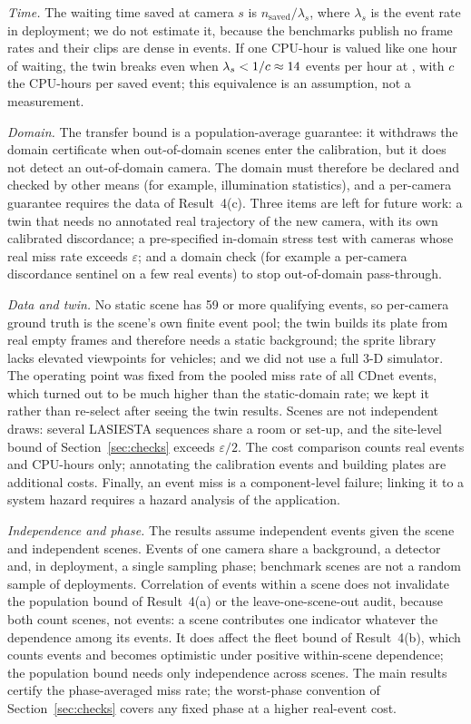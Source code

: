 \emph{Time.} The waiting time saved at camera $s$ is $n_{\mathrm{saved}}/\lambda_s$, where $\lambda_s$ is the event rate
in deployment; we do not estimate it, because the benchmarks publish no frame rates and their clips are dense in events.
If one CPU-hour is valued like one hour of waiting, the twin breaks even when $\lambda_s<1/c\approx14$ events per
hour at \OPs{}, with $c$ the CPU-hours per saved event; this equivalence is an assumption, not a measurement.

\emph{Domain.} The transfer bound is a population-average guarantee: it withdraws the domain certificate when
out-of-domain scenes enter the calibration, but it does not detect an out-of-domain camera. The domain must therefore be
declared and checked by other means (for example, illumination statistics), and a per-camera guarantee requires the
data of Result~4(c). Three items are left for future work: a twin that needs no annotated real trajectory of the new camera, with its own
calibrated discordance; a pre-specified in-domain stress test with cameras whose real miss rate exceeds $\varepsilon$;
and a domain check (for example a per-camera discordance sentinel on a few real events) to stop out-of-domain
pass-through.

\emph{Data and twin.} No static scene has 59 or more qualifying events, so per-camera ground truth is the scene's own
finite event pool; the twin builds its plate from real empty frames and therefore needs a static background; the sprite
library lacks elevated viewpoints for vehicles; and we did not use a full 3-D simulator. The operating point was fixed
from the pooled miss rate of all CDnet events, which turned out to be much higher than the static-domain rate; we kept it
rather than re-select after seeing the twin results. Scenes are not independent draws: several LASIESTA sequences share a room or set-up, and the site-level bound of
Section~\ref{sec:checks} exceeds $\varepsilon/2$. The
cost comparison counts real events and CPU-hours only; annotating the calibration events and building plates are
additional costs. Finally, an event miss is a component-level failure; linking it to a system hazard requires a
hazard analysis of the application.

\emph{Independence and phase.} The results assume independent events given the scene and independent scenes. Events
of one camera share a background, a detector and, in deployment, a single sampling phase; benchmark scenes are not a
random sample of deployments. Correlation of events within a scene does not invalidate the population bound of
Result~4(a) or the leave-one-scene-out audit, because both count scenes, not events: a scene contributes one
indicator whatever the dependence among its events. It does affect the fleet bound of Result~4(b), which counts
events and becomes optimistic under positive within-scene dependence; the population bound needs only independence
across scenes. The main results certify the phase-averaged miss rate; the worst-phase convention of Section~\ref{sec:checks} covers any
fixed phase at a higher real-event cost.


